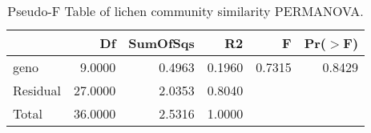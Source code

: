 \begin{table}[ht]
\centering
\begin{tabular}{lrrrrr}
  \hline
 & Df & SumOfSqs & R2 & F & Pr($>$F) \\ 
  \hline
geno & 9.0000 & 0.4963 & 0.1960 & 0.7315 & 0.8429 \\ 
  Residual & 27.0000 & 2.0353 & 0.8040 &  &  \\ 
  Total & 36.0000 & 2.5316 & 1.0000 &  &  \\ 
   \hline
\end{tabular}
\caption{Pseudo-F Table of lichen community similarity PERMANOVA.} 
\label{tab:com_perm}
\end{table}
